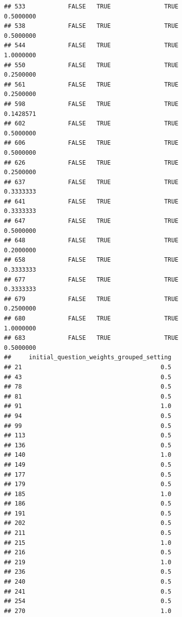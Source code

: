 \documentclass[
]{article}
\begin{document}
\begin{verbatim}
## 533            FALSE   TRUE               TRUE                0.5000000
## 538            FALSE   TRUE               TRUE                0.5000000
## 544            FALSE   TRUE               TRUE                1.0000000
## 550            FALSE   TRUE               TRUE                0.2500000
## 561            FALSE   TRUE               TRUE                0.2500000
## 598            FALSE   TRUE               TRUE                0.1428571
## 602            FALSE   TRUE               TRUE                0.5000000
## 606            FALSE   TRUE               TRUE                0.5000000
## 626            FALSE   TRUE               TRUE                0.2500000
## 637            FALSE   TRUE               TRUE                0.3333333
## 641            FALSE   TRUE               TRUE                0.3333333
## 647            FALSE   TRUE               TRUE                0.5000000
## 648            FALSE   TRUE               TRUE                0.2000000
## 658            FALSE   TRUE               TRUE                0.3333333
## 677            FALSE   TRUE               TRUE                0.3333333
## 679            FALSE   TRUE               TRUE                0.2500000
## 680            FALSE   TRUE               TRUE                1.0000000
## 683            FALSE   TRUE               TRUE                0.5000000
##     initial_question_weights_grouped_setting
## 21                                       0.5
## 43                                       0.5
## 78                                       0.5
## 81                                       0.5
## 91                                       1.0
## 94                                       0.5
## 99                                       0.5
## 113                                      0.5
## 136                                      0.5
## 140                                      1.0
## 149                                      0.5
## 177                                      0.5
## 179                                      0.5
## 185                                      1.0
## 186                                      0.5
## 191                                      0.5
## 202                                      0.5
## 211                                      0.5
## 215                                      1.0
## 216                                      0.5
## 219                                      1.0
## 236                                      0.5
## 240                                      0.5
## 241                                      0.5
## 254                                      0.5
## 270                                      1.0

\end{verbatim}
\end{document}

